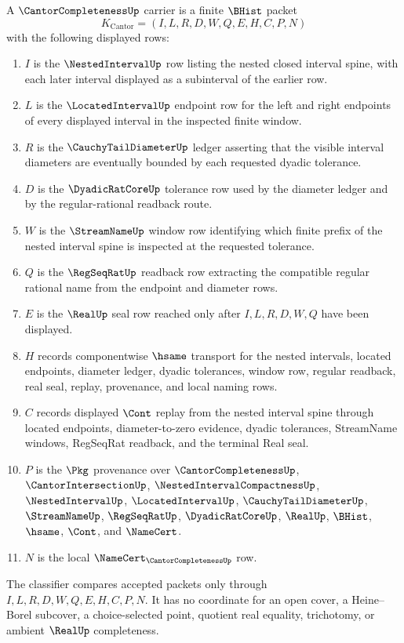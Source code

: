 \begin{definition}
\label{def:cantor-completeness-carrier}
A $\CantorCompletenessUp$ carrier is a finite $\BHist$ packet
$$
K_{\mathrm{Cantor}}=(I,L,R,D,W,Q,E,H,C,P,N)
$$
with the following displayed rows:
\begin{enumerate}
\item $I$ is the $\NestedIntervalUp$ row listing the nested closed interval spine, with each later interval displayed as a subinterval of the earlier row.
\item $L$ is the $\LocatedIntervalUp$ endpoint row for the left and right endpoints of every displayed interval in the inspected finite window.
\item $R$ is the $\CauchyTailDiameterUp$ ledger asserting that the visible interval diameters are eventually bounded by each requested dyadic tolerance.
\item $D$ is the $\DyadicRatCoreUp$ tolerance row used by the diameter ledger and by the regular-rational readback route.
\item $W$ is the $\StreamNameUp$ window row identifying which finite prefix of the nested interval spine is inspected at the requested tolerance.
\item $Q$ is the $\RegSeqRatUp$ readback row extracting the compatible regular rational name from the endpoint and diameter rows.
\item $E$ is the $\RealUp$ seal row reached only after $I,L,R,D,W,Q$ have been displayed.
\item $H$ records componentwise $\hsame$ transport for the nested intervals, located endpoints, diameter ledger, dyadic tolerances, window row, regular readback, real seal, replay, provenance, and local naming rows.
\item $C$ records displayed $\Cont$ replay from the nested interval spine through located endpoints, diameter-to-zero evidence, dyadic tolerances, StreamName windows, RegSeqRat readback, and the terminal Real seal.
\item $P$ is the $\Pkg$ provenance over $\CantorCompletenessUp$, $\CantorIntersectionUp$, $\NestedIntervalCompactnessUp$, $\NestedIntervalUp$, $\LocatedIntervalUp$, $\CauchyTailDiameterUp$, $\StreamNameUp$, $\RegSeqRatUp$, $\DyadicRatCoreUp$, $\RealUp$, $\BHist$, $\hsame$, $\Cont$, and $\NameCert$.
\item $N$ is the local $\NameCert_{\CantorCompletenessUp}$ row.
\end{enumerate}
The classifier compares accepted packets only through $I,L,R,D,W,Q,E,H,C,P,N$. It has no coordinate for an open cover, a Heine--Borel subcover, a choice-selected point, quotient real equality, trichotomy, or ambient $\RealUp$ completeness.
\end{definition}

